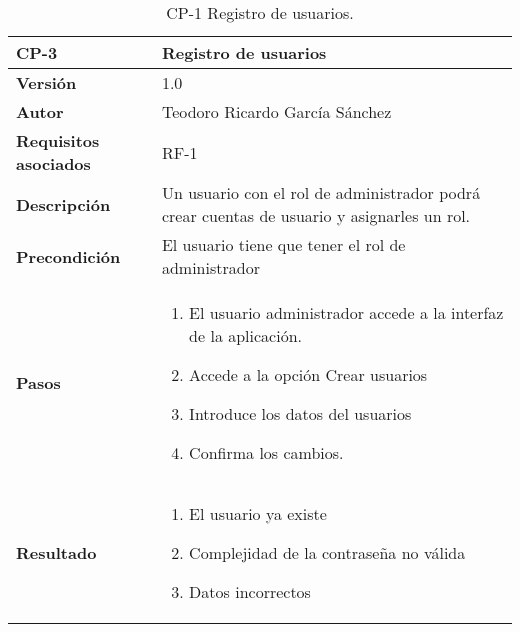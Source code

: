\begin{table}[p]
	\centering
	\begin{tabularx}{\linewidth}{ p{} p{} }
		\toprule
		\textbf{CP-3}    & \textbf{Registro de usuarios}\\
		\toprule
		\textbf{Versión}              & 1.0    \\
		\textbf{Autor}                & Teodoro Ricardo García Sánchez \\
		\textbf{Requisitos asociados} & RF-1 \\
		\textbf{Descripción}          & Un usuario con el rol de administrador podrá crear cuentas de usuario y asignarles un rol. \\
		\textbf{Precondición}         & El usuario tiene que tener el rol de administrador \\
		\textbf{Pasos}             &
		\begin{enumerate}
			\def\labelenumi{\arabic{enumi}.}
			\tightlist
			\item El usuario administrador accede a la interfaz de la aplicación.
			\item Accede a la opción Crear usuarios
			\item Introduce los datos del usuarios
			\item Confirma los cambios.
		\end{enumerate}\\
		\textbf{Resultado}          & 
		\begin{enumerate}
			\item El usuario ya existe
			\item Complejidad de la contraseña no válida
			\item Datos incorrectos
		\end{enumerate}\\
		\bottomrule
	\end{tabularx}
	\caption{CP-1 Registro de usuarios.}
\end{table}

\newpage

